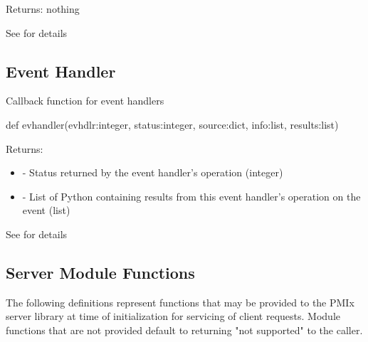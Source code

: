 Returns: nothing

See  for details


\subsection{Event Handler}

\summary

Callback function for event handlers

\format

\pyspecificstart
\begin{codepar}
def evhandler(evhdlr:integer, status:integer,
              source:dict, info:list, results:list)
\end{codepar}
\pyspecificend

\begin{arglist}
\end{arglist}

Returns:
\begin{itemize}
    \item {} - Status returned by the event handler's operation (integer)
    \item {} - List of Python  containing results from this event handler's operation on the event (list)
\end{itemize}

See  for details


\subsection{Server Module Functions}

The following definitions represent functions that may be provided to the \ac{PMIx} server library at time of initialization for servicing of client requests. Module functions that are not provided default to returning "not supported" to the caller.


